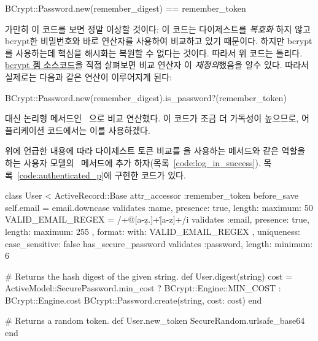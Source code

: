 {{%
\begin{code} BCrypt::Password.new(remember_digest) == remember_token \end{code} 

\noindent 가만히 이 코드를 보면 정말 이상할 것이다: 이 코드는 다이제스트를 \emph{복호화} 하지 않고 bcrypt한 비밀번호와 바로 \kode{==}연산자를 사용하여 비교하고 있기 때문이다. 하지만 bcrypt를 사용하는데 핵심을 해시화는 복원할 수 없다는 것이다. 따라서 위 코드는 틀리다. \href{https://github.com/codahale/bcrypt-ruby/blob/master/lib/bcrypt/password.rb}{bcrypt 젬 소스코드}을 직접 살펴보면 비교 연산자 \kode{==} 이 \emph{재정의}했음을 알수 있다. 따라서 실제로는 다음과 같은 연산이 이루어지게 된다: 

\begin{code} BCrypt::Password.new(remember_digest).is_password?(remember_token) \end{code} 

\noindent \kode{==} 대신 논리형 메서드인 \ 으로 비교 연산했다. 이 코드가 조금 더 가독성이 높으므로, 어플리케이션 코드에서는 이를 사용하겠다. 

위에 언급한 내용에 따라 다이제스트 토큰 비교를 을 사용하는  메서드와 같은 역할을 하는 사용자 모델의 \ 메서드에 추가 하자(목록~\ref{code:log_in_success}). 목록~\ref{code:authenticated_p}에 구현한 코드가 있다. 

\begin{codelisting} \label{code:authenticated_p}  

\begin{code} class User < ActiveRecord::Base attr_accessor :remember_token before_save { self.email = email.downcase } validates :name, presence: true, length: { maximum: 50 } VALID_EMAIL_REGEX = /\A[\w+\-.]+@[a-z\d\-.]+\.[a-z]+\z/i validates :email, presence: true, length: { maximum: 255 }, format: { with: VALID_EMAIL_REGEX }, uniqueness: { case_sensitive: false } has_secure_password validates :password, length: { minimum: 6 } 

# Returns the hash digest of the given string. def User.digest(string) cost = ActiveModel::SecurePassword.min_cost ? BCrypt::Engine::MIN_COST : BCrypt::Engine.cost BCrypt::Password.create(string, cost: cost) end 

# Returns a random token. def User.new_token SecureRandom.urlsafe_base64 end 


\end{code}
\end{codelisting}}}
